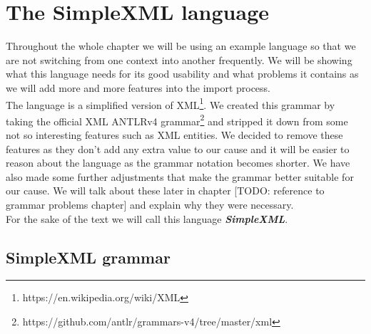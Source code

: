 \section{The SimpleXML language}

Throughout the whole chapter we will be using an example language so that we are not switching from one context into another frequently. We will be showing what this language needs for its good usability and what problems it contains as we will add more and more features into the import process.
\\

The language is a simplified version of XML\footnote{https://en.wikipedia.org/wiki/XML}. We created this grammar by taking the official XML ANTLRv4 grammar\footnote{https://github.com/antlr/grammars-v4/tree/master/xml} and stripped it down from some not so interesting features such as XML entities. We decided to remove these features as they don't add any extra value to our cause and it will be easier to reason about the language as the grammar notation becomes shorter. We have also made some further adjustments that make the grammar better suitable for our cause. We will talk about these later in chapter [TODO: reference to grammar problems chapter] and explain why they were necessary.
\\

For the sake of the text we will call this language \textbf{\textit{SimpleXML}}.

\subsection{SimpleXML grammar}

